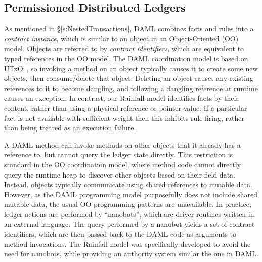 \subsection{Permissioned Distributed Ledgers}
\label{s:RelatedPermissioned}
As mentioned in \S\ref{s:NestedTransactions}, DAML combines facts and rules into a \emph{contract instance}, which is similar to an object in an Object-Oriented (OO) model. Objects are referred to by \emph{contract identifiers}, which are equivalent to typed references in the OO model. The DAML coordination model is based on UTxO~\cite{Zahnentferner2018:UTxO}, so invoking a method on an object typically causes it to create some new objects, then consume/delete that object. Deleting an object causes any existing references to it to become dangling, and following a dangling reference at runtime causes an exception. In contrast, our Rainfall model identifies facts by their content, rather than using a physical reference or pointer value. If a particular fact is not available with sufficient weight then this inhibits rule firing, rather than being treated as an execution failure.

A DAML method can invoke methods on other objects that it already has a reference to, but cannot query the ledger state directly. This restriction is standard in the OO coordination model, where method code cannot directly query the runtime heap to discover other objects based on their field data. Instead, objects typically communicate using shared references to mutable data. However, as the DAML programming model purposefully does not include shared mutable data, the usual OO programming patterns are unavailable. In practice, ledger actions are performed by ``nanobots'', which are driver routines written in an external language. The query performed by a nanobot yields a set of contract identifiers, which are then passed back to the DAML code as arguments to method invocations. The Rainfall model was specifically developed to avoid the need for nanobots, while providing an authority system similar the one in DAML.


